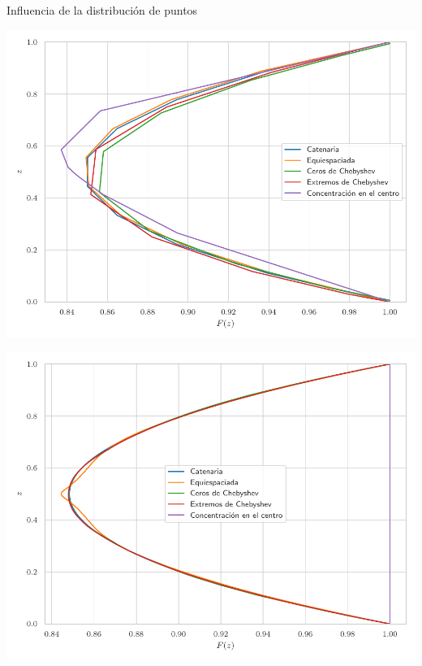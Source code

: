 \documentclass[11pt]{beamer}
\begin{document}
            \begin{frame}{Influencia de la distribución de puntos}
			\justifying
			\begin{minipage}[b]{0.48\textwidth}
                    \centering
                    \includegraphics[height=0.5 \textheight]{Figuras/sol_distrib_n10.pdf}
                \end{minipage}
                \hfill
                \begin{minipage}[b]{0.48\textwidth}
                    \centering
                    \includegraphics[height=0.5 \textheight]{Figuras/sol_distrib_n200.pdf}
                \end{minipage}
		\end{frame}
\end{document}
